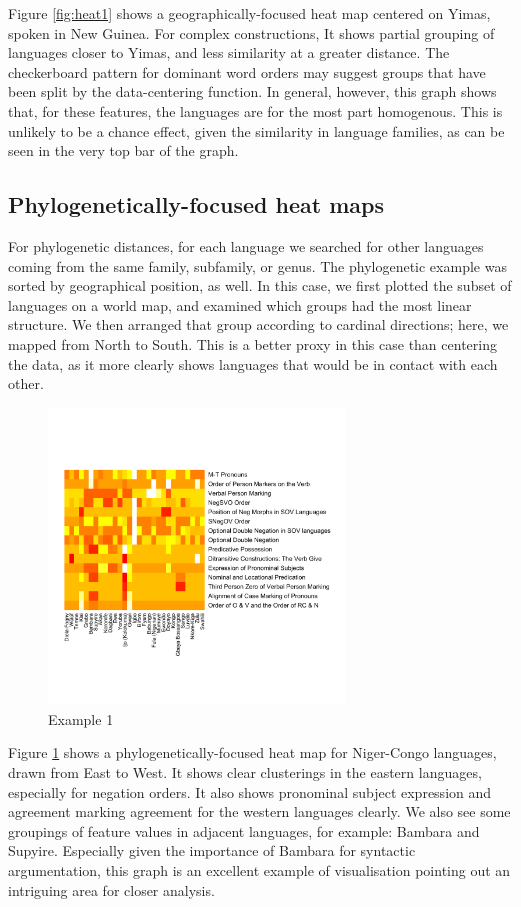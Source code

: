 \documentclass[11pt]{article}
\begin{document}
Figure \ref{fig:heat1} shows a geographically-focused heat map centered on Yimas, spoken in New Guinea. For complex constructions, It shows partial grouping of languages closer to Yimas, and less similarity at a greater distance. The checkerboard pattern for dominant word orders may suggest groups that have been split by the data-centering function. In general, however, this graph shows that, for these features, the languages are for the most part homogenous. This is unlikely to be a chance effect, given the similarity in language families, as can be seen in the very top bar of the graph.

\subsection{Phylogenetically-focused heat maps}

For phylogenetic distances, for each language we searched for other languages coming from the same family, subfamily, or genus.
The phylogenetic example was sorted by geographical position, as well. In this case, we first plotted the subset of languages on a world map, and examined which groups had the most linear structure. We then arranged that group according to cardinal directions; here, we mapped from North to South. This is a better proxy in this case than centering the data, as it more clearly shows languages that would be in contact with each other. 


\begin{figure}[ht!]
\includegraphics[width=3.1in]
{graph3nigercongosmall.pdf} 
\caption{Example 1} 
\label{fig:heat2} 
\end{figure}


Figure \ref{fig:heat2} shows a phylogenetically-focused heat map for Niger-Congo languages, drawn from East to West. It shows clear clusterings in the eastern languages, especially for negation orders. It also shows pronominal subject expression and agreement marking agreement for the western languages clearly. We also see some groupings of feature values in adjacent languages, for example: Bambara and Supyire. 
Especially given the importance of Bambara for syntactic argumentation, this graph is an excellent example of visualisation pointing out an intriguing area for closer analysis.
\end{document}
